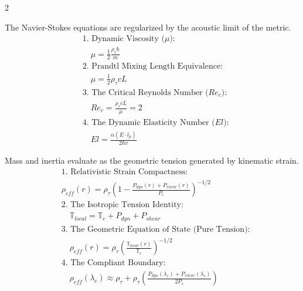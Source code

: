 \begin{multicols}{2}
\begin{tcolorbox}[cheatbox, title={\refstepcounter{cheatnum}\label{box:ns_reg}\thecheatnum. Navier-Stokes Regularization \scriptsize\hfill\hyperref[sec:deriv_ns_reg]{[Proof $\downarrow$]}}]
The Navier-Stokes equations are regularized by the acoustic limit of the metric. 
\begin{align}
    &\text{1. Dynamic Viscosity ($\mu$):} \nonumber \\
    &\quad \mu = \frac{1}{2} \frac{\rho_{\tau} \hbar}{m} \label{eq:vacuum_viscosity} \\
    &\text{2. Prandtl Mixing Length Equivalence:} \nonumber \\
    &\quad \mu = \frac{1}{2} \rho_{\tau} c L \label{eq:prandtl_equivalence} \\
    &\text{3. The Critical Reynolds Number ($Re_c$):} \nonumber \\
    &\quad Re_c = \frac{\rho_{\tau} c L}{\mu} = 2 \label{eq:critical_reynolds} \\
    &\text{4. The Dynamic Elasticity Number ($El$):} \nonumber \\
    &\quad El = \frac{\alpha (E \cdot l_p)}{2 \hbar v} \label{eq:dynamic_elasticity}
\end{align}
\end{tcolorbox}

\begin{tcolorbox}[cheatbox, title={\refstepcounter{cheatnum}\label{box:fluid_inertia}\thecheatnum. Origin of Inertia (Strain Compactness) \scriptsize\hfill\hyperref[sec:deriv_fluid_inertia]{[Proof $\downarrow$]}}]
Mass and inertia evaluate as the geometric tension generated by kinematic strain.
\begin{align}
    &\text{1. Relativistic Strain Compactness:} \nonumber \\
    &\rho_{eff}(r) = \rho_{\tau} \left( 1 - \frac{P_{dyn}(r) + P_{shear}(r)}{P_c} \right)^{-1/2} \label{eq:fluid_inertia_gradient} \\
    &\text{2. The Isotropic Tension Identity:} \nonumber \\
    &\quad \mathbb{T}_{local} = \mathbb{T}_c + P_{dyn} + P_{shear} \label{eq:tension_identity} \\
    &\text{3. The Geometric Equation of State (Pure Tension):} \nonumber \\
    &\quad \rho_{eff}(r) = \rho_{\tau} \left( \frac{\mathbb{T}_{local}(r)}{\mathbb{T}_c} \right)^{-1/2} \label{eq:tension_density} \\
    &\text{4. The Compliant Boundary:} \nonumber \\
    &\quad \rho_{eff}(\lambda_c) \approx \rho_{\tau} + \rho_{\tau} \left( \frac{P_{dyn}(\lambda_c) + P_{shear}(\lambda_c)}{2P_c} \right) \label{eq:compliant_inertia}
\end{align}
\end{tcolorbox}



\end{multicols}
